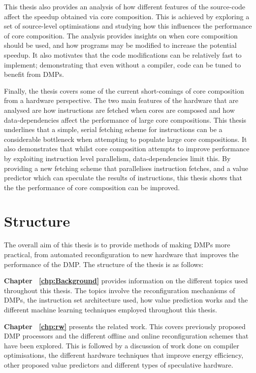 This thesis also provides an analysis of how different features of the source-code affect the speedup obtained via core composition.
This is achieved by exploring a set of source-level optimisations and studying how this influences the performance of core composition.
The analysis provides insights on when core composition should be used, and how programs may be modified to increase the potential speedup.
It also motivates that the code modifications can be relatively  fast to implement; demonstrating that even without a compiler, code can be tuned to benefit from DMPs.

Finally, the thesis covers some of the current short-comings of core composition from a hardware perspective.
The two main features of the hardware that are analysed are how instructions are fetched when cores are composed and how data-dependencies affect the performance of large core compositions.
This thesis underlines that a simple, serial fetching scheme for instructions can be a considerable bottleneck when attempting to populate large core compositions.
It also demonstrates that whilst core composition attempts to improve performance by exploiting instruction level parallelism, data-dependencies limit this.
By providing a new fetching scheme that parallelises instruction fetches, and a value predictor which can speculate the results of instructions, this thesis shows that the the performance of core composition can be improved.


\section{Structure}
The overall aim of this thesis is to provide methods of making DMPs more practical, from automated reconfiguration to new hardware that improves the performance of the DMP.
The structure of the thesis is as follows:

\textbf{Chapter ~\ref{chp:Background}} provides information on the different topics used throughout this thesis. The topics involve the reconfiguration mechanisms of DMPs, the instruction set architecture used, how value prediction works and the different machine learning techniques employed throughout this thesis.

\textbf{Chapter ~\ref{chp:rw}} presents the related work. This covers previously proposed DMP processors and the different offline and online reconfiguration schemes that have been explored. 
This is followed by a discussion of work done on compiler optimisations, the different hardware techniques that improve energy efficiency, other proposed value predictors and different types of speculative hardware.

